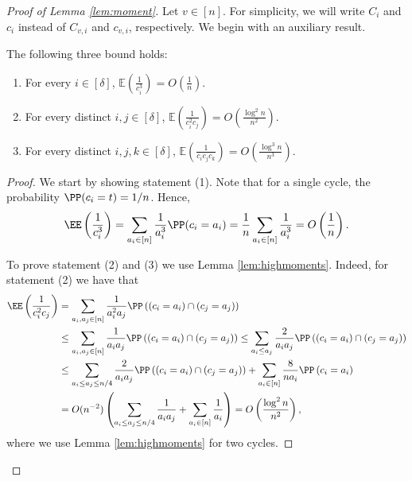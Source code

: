 \documentclass{article}
\begin{document}
\begin{proof}[Proof of Lemma \ref{lem:moment}]
Let $v \in [n]$. For simplicity, we will write $C_i$ and $c_i$ instead of $C_{v,i}$ and $c_{v,i}$, respectively. We begin with an auxiliary result.

\begin{claim}\label{clm:expect}
The following three bound holds:
\begin{enumerate}
		\item For every $i \in [\delta]$, 
		$\mathbb E\left(\frac{1}{c^3_{i}} \right) = O\left(\frac{1}{n} \right)$.
		\item For every distinct $i,j \in [\delta]$,
		$\mathbb E \left(\frac{1}{c^2_{i} c_{j}} \right) = O\left(\frac{\log^2 n}{n^2} \right).$
		
		\item For every distinct $i,j,k \in [\delta]$,
		$\mathbb E \left(\frac{1}{c_{i} c_{j} c_{k}} \right) = O \left(\frac{\log^3 n}{n^3} \right)$.
\end{enumerate}
\end{claim}

\begin{proof}
We start by showing statement (1). Note that for a single cycle, the probability $\PP(c_i=t)=1/n$. Hence,
\begin{align*}
    \EE\left(\frac{1}{c_i^3}\right)=\sum_{a_i\in [n]}\frac{1}{a_i^3}\PP(c_i=a_i)=\frac{1}{n}\sum_{a_i\in [n]}\frac{1}{a_i^3}=O\left(\frac{1}{n}\right).
\end{align*}

To prove statement (2) and (3) we use Lemma \ref{lem:highmoments}. Indeed, for statement (2) we have that
\begin{align*}
    \EE\left(\frac{1}{c_i^2c_j}\right)&=\sum_{a_i,a_j \in [n]}\frac{1}{a_i^2a_j}\PP\left((c_i=a_i)\cap(c_j=a_j)\right)\\ &\leq \sum_{a_i,a_j \in [n]}\frac{1}{a_ia_j}\PP\left((c_i=a_i)\cap(c_j=a_j)\right)\leq \sum_{a_i\leq a_j}\frac{2}{a_ia_j}\PP\left((c_i=a_i)\cap(c_j=a_j)\right)\\
    &\leq\sum_{a_i\leq a_j\leq n/4}\frac{2}{a_ia_j}\PP\left((c_i=a_i)\cap(c_j=a_j)\right)+\sum_{a_i\in [n]}\frac{8}{na_i}\PP\left(c_i=a_i\right)\\
    &=O(n^{-2})\left(\sum_{a_i\leq a_j\leq n/4}\frac{1}{a_ia_j}+\sum_{a_i\in [n]}\frac{1}{a_i}\right)=O\left(\frac{\log^2 n}{n^2}\right),
\end{align*}
where we use Lemma \ref{lem:highmoments} for two cycles.


\end{proof}
\end{proof}
\end{document}
